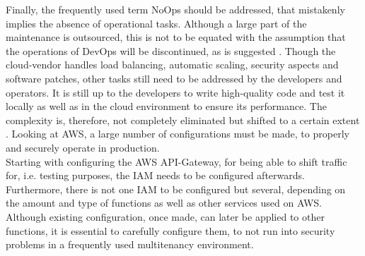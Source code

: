 \documentclass[11pt]{article}
\begin{document}
Finally, the frequently used term \glqq NoOps\grqq{} \cite{fowler2018serverless} should be addressed, that mistakenly implies the absence of operational tasks. Although a large part of the maintenance is outsourced, this is not to be equated with the assumption that the operations of DevOps will be discontinued, as is suggested \cite{fowler2018serverless}.  Though the cloud-vendor handles load balancing, automatic scaling, security aspects and software patches, other tasks still need to be addressed by the developers and operators. It is still up to the developers to write high-quality code and test it locally as well as in the cloud environment to ensure its performance. The complexity is, therefore, not completely eliminated but shifted to a certain extent \cite{eivy2017wary}. Looking at AWS, a large number of configurations must be made, to properly and securely operate in production.\\ Starting with configuring the AWS API-Gateway, for being able to shift traffic for, i.e. testing purposes, the IAM needs to be configured afterwards. Furthermore, there is not one IAM to be configured but several, depending on the amount and type of functions as well as other services used on AWS. Although existing configuration, once made, can later be applied to other functions, it is essential to carefully configure them, to not run into security problems in a frequently used multitenancy environment.
\end{document}
